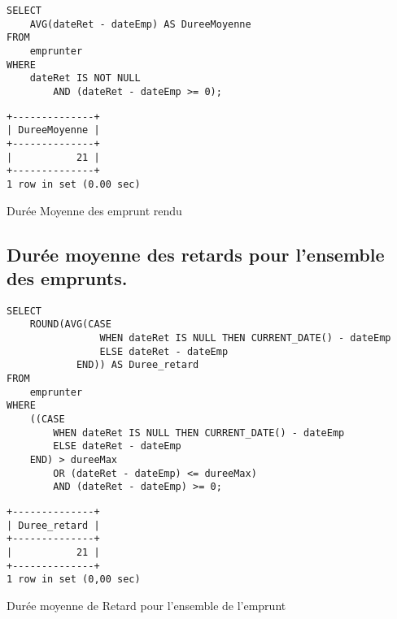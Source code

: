 \documentclass{article}
\begin{document}
\begin{center}
\begin{minipage}{0.6\linewidth}
\begin{listing}[H]
\begin{verbatim}
SELECT 
    AVG(dateRet - dateEmp) AS DureeMoyenne
FROM
    emprunter
WHERE
    dateRet IS NOT NULL
        AND (dateRet - dateEmp >= 0);
\end{verbatim}
\begin{verbatim}
+--------------+
| DureeMoyenne |
+--------------+
|           21 |
+--------------+
1 row in set (0.00 sec)
\end{verbatim}
\caption{Durée Moyenne des emprunt rendu}
\end{listing}
\end{minipage}
\end{center}

\subsection{Durée moyenne des retards pour l’ensemble des emprunts.}
\begin{center}
\begin{minipage}{0.7\linewidth}
\begin{listing}[H]
\begin{verbatim}
SELECT 
    ROUND(AVG(CASE
                WHEN dateRet IS NULL THEN CURRENT_DATE() - dateEmp
                ELSE dateRet - dateEmp
            END)) AS Duree_retard
FROM
    emprunter
WHERE
    ((CASE
        WHEN dateRet IS NULL THEN CURRENT_DATE() - dateEmp
        ELSE dateRet - dateEmp
    END) > dureeMax
        OR (dateRet - dateEmp) <= dureeMax)
        AND (dateRet - dateEmp) >= 0;
\end{verbatim}
\begin{verbatim}
+--------------+
| Duree_retard |
+--------------+
|           21 |
+--------------+
1 row in set (0,00 sec)
\end{verbatim}
\caption{Durée moyenne de Retard pour l'ensemble de l'emprunt}
\end{listing}
\end{minipage}
\end{center}
\end{document}
